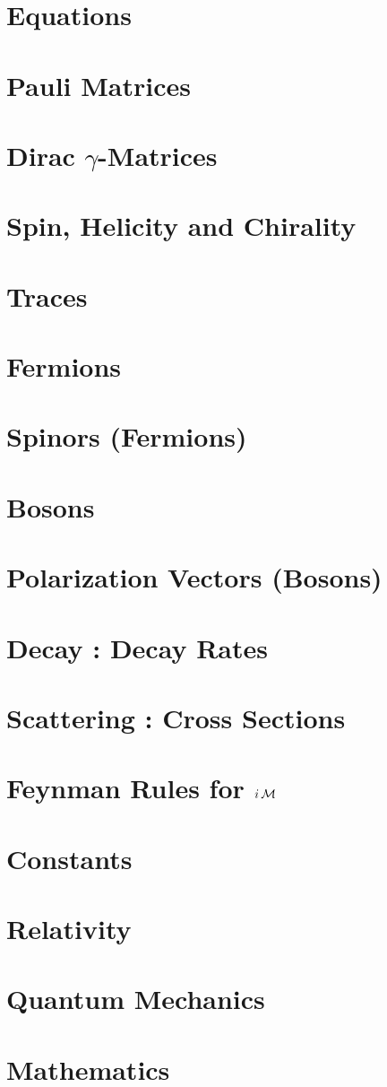 \documentclass[landscape,8pt,a4paper,english]{extarticle}
\begin{document}
\begin{multicols*}{3}\centering
        \section*{Equations}
        \section*{Pauli Matrices}
        \section*{Dirac $\gamma$-Matrices}
        \section*{Spin, Helicity and Chirality}
        \section*{Traces}
        \section*{Fermions}
        \section*{Spinors (Fermions)}
        \section*{Bosons}
        \section*{Polarization Vectors (Bosons)}
        \section*{Decay : Decay Rates}
        \section*{Scattering : Cross Sections}
        \section*{Feynman Rules for $i\operatorname{\mathcal{M}}$}
        \section*{Constants}
        \section*{Relativity}
        \section*{Quantum Mechanics}
        \section*{Mathematics}
\end{multicols*}
\end{document}
